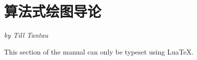 %
%
%



\section{算法式绘图导论}
\label{section-intro-gd}

\emph{by Till Tantau}

\ifluatex\else This section of the manual can only be typeset using Lua\TeX.\expandafter\endinput\fi


\subsection{什么是算法式绘图？}


\emph{算法式绘图}（下文也称\emph{绘图}）
是一个程序式计算图上节点位置以达到输出“好看的”绘图效果的过程。
这个方法就是读者，作为人类（亦或恰巧在读这个文档的机器），
给出将要绘制的图上存在的点、边（余下的工作就由计算机完成了）。
除此之外，读者还可能需要添加一些“提示”比如 ``this node should be near the center''
或者 ``this edge is pretty important.'' 之类的。
你\emph{并不}需要明确给出点和边的位置。
这些就是你需要交给\emph{绘图}的东西。
绘图算法会解释出你对图的描述并决定节点在页面上的位置。

